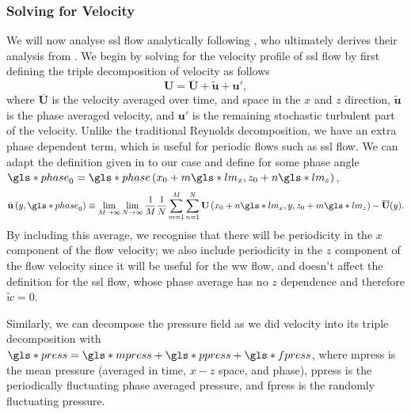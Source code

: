 \subsubsection{Solving for Velocity}
We will now analyse \gls*{ssl} flow analytically following \textcite{chernyshenko2013}, who ultimately derives their analysis from \textcite{viotti2009}. We begin by solving for the velocity profile of \gls*{ssl} flow by first defining the triple decomposition of velocity as follows
\begin{equation}
	\mathbf{U} = \overline{\mathbf{U} }+\tilde{\mathbf{u} }+\mathbf{u'}  
,\end{equation}
where $\overline{\mathbf{U} }$ is the velocity averaged over time, and space in the $x$ and  $z$ direction, $\tilde{\mathbf{u} }$ is the phase averaged velocity, and $\mathbf{u'} $ is the remaining stochastic turbulent part of the velocity. Unlike the traditional Reynolds decomposition, we have an extra phase dependent term, which is useful for periodic flows such as \gls*{ssl} flow. We can adapt the definition given in \cite{baj2015} to our case and define for some phase angle $\gls*{phase}_0=\gls*{phase}\left(x_0+m \gls*{lm}_x,z_0+n \gls*{lm}_z\right)$,
\begin{equation}
	\tilde{\mathbf{u} }\left(y,\gls*{phase}_0\right)\equiv\lim_{M\to\infty}\lim_{N\to\infty}\frac{1}{M}\frac{1}{N} \sum_{m=1}^{M} \sum_{n=1}^{N} \mathbf{U}\left(x_0+n \gls*{lm}_x,y,z_0 +m \gls*{lm}_z\right)-\overline{\mathbf{U} }(y)  
.\end{equation}
By including this average, we recognise that there will be periodicity in the $x$ component of the flow velocity; we also include periodicity in the $z$ component of the flow velocity since it will be useful for the \gls*{ww} flow, and doesn't affect the definition for the \gls*{ssl} flow, whose phase average has no $z$ dependence and therefore $\tilde{w}=0$.

Similarly, we can decompose the pressure field as we did velocity into its triple decomposition with $\gls*{press}=\gls*{mpress}+\gls*{ppress}+\gls*{fpress}$, where \gls*{mpress} is the mean pressure (averaged in time, $x-z$ space, and phase), \gls*{ppress} is the periodically fluctuating phase averaged pressure, and \gls*{fpress} is the randomly fluctuating pressure.

